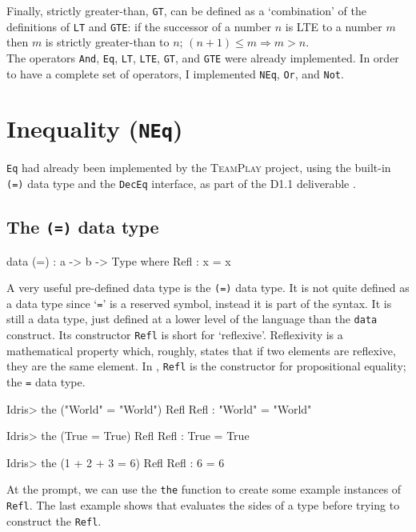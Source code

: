         Finally, strictly greater-than, \texttt{GT}, can be defined as a `combination' of the definitions of \texttt{LT} and \texttt{GTE}: if the successor of a number $n$ is LTE to a number $m$ then $m$ is strictly greater-than to $n$; $(n + 1) \leq m \Rightarrow m > n$.
        \\
        
        The operators \texttt{And}, \texttt{Eq}, \texttt{LT}, \texttt{LTE}, \texttt{GT}, and \texttt{GTE} were already implemented. In order to have a complete set of operators, I implemented \texttt{NEq}, \texttt{Or}, and \texttt{Not}.


\section{Inequality (\texttt{NEq})}\label{des:neq}
    \texttt{Eq} had already been implemented by the \textsc{TeamPlay} project, using the built-in \texttt{(=)} data type and the \texttt{DecEq} interface, as part of the D1.1 deliverable \cite{teamplay:d1.1}.
    
    \subsection{The \texttt{(=)} data type}
        \begin{code}[label={des:refl-concept}, caption={The concept of an equality data type}]
        data (=) : a -> b -> Type where
            Refl : x = x
        \end{code}
    
        A very useful pre-defined data type is the \texttt{(=)} data type. It is not quite defined as a data type since `\texttt{=}' is a reserved symbol, instead it is part of the \Idris syntax. It is still a data type, just defined at a lower level of the language than the \texttt{data} construct. Its constructor \texttt{Refl} is short for `reflexive'. Reflexivity is a mathematical property which, roughly, states that if two elements are reflexive, they are the same element. In \Idris, \texttt{Refl} is the constructor for propositional equality; the \texttt{=} data type.
    
        \begin{code}[label={des:refl-egs}, caption={Examples of reflexivity}]
        Idris> the ("World" = "World") Refl
        Refl : "World" = "World"
        
        
        Idris> the (True = True) Refl
        Refl : True = True
        
        
        Idris> the (1 + 2 + 3 = 6) Refl
        Refl : 6 = 6
        \end{code}
        At the \Idris prompt, we can use the \texttt{the} function to create some example instances of \texttt{Refl}. The last example shows that \Idris evaluates the sides of a type before trying to construct the \texttt{Refl}.
    
